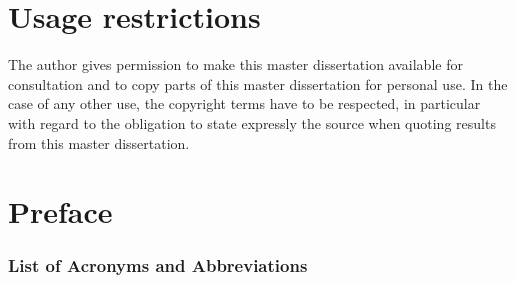 \documentclass[11pt,british]{article}
\begin{document}
\newpage
\thispagestyle{empty}
\mbox{}




\newpage{}\part*{Usage restrictions}

The author gives permission to make this master dissertation available for consultation 
and to copy parts of this master dissertation for personal use. 
 In the case of any other use, the copyright terms have to be respected, in particular with regard to 
the obligation to state expressly the source when quoting results from this master dissertation.

\pagebreak{}


\newpage{}\part*{Preface}

\pagebreak{}


\newpage{}
\begin{abstract}
\end{abstract}





\tableofcontents
\pagebreak


\listoffigures
\pagebreak


\listoftables
\pagebreak


\section*{List of Acronyms and Abbreviations}
\pagebreak
\end{document}
